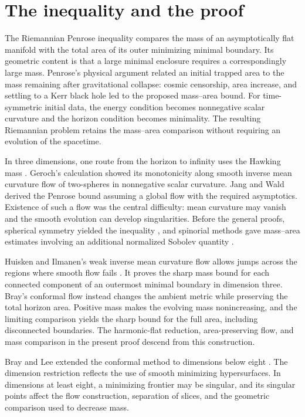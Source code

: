\section{The inequality and the proof}
\label{sec:rpi:introduction}

The Riemannian Penrose inequality compares the mass of an asymptotically
flat manifold with the total area of its outer minimizing minimal
boundary. Its geometric content is that a large minimal enclosure
requires a correspondingly large mass. Penrose's physical argument
\cite{Penrose1973} related an initial trapped area to the mass remaining
after gravitational collapse: cosmic censorship, area increase, and
settling to a Kerr black hole led to the proposed mass--area bound.
For time-symmetric initial data, the energy condition becomes
nonnegative scalar curvature and the horizon condition becomes
minimality. The resulting Riemannian problem retains the mass--area
comparison without requiring an evolution of the spacetime.

In three dimensions, one route from the horizon to infinity uses the Hawking mass
\cite{Hawking1968}. Geroch's calculation \cite{Geroch1973} showed its
monotonicity along smooth inverse mean curvature flow of two-spheres
in nonnegative scalar curvature. Jang and
Wald \cite[Section~5]{JangWald1977} derived the Penrose bound assuming
a global flow with the required asymptotics. Existence of such a flow
was the central difficulty: mean curvature may vanish and the smooth
evolution can develop singularities. Before the general proofs,
spherical symmetry yielded the inequality \cite{MalecOMurchadha1994},
and spinorial methods gave mass--area estimates involving an additional
normalized Sobolev quantity \cite{Herzlich1997}.

Huisken and Ilmanen's weak inverse mean curvature flow allows jumps
across the regions where smooth flow fails \cite{HuiskenIlmanen2001}.
It proves the sharp mass bound for each connected component of an
outermost minimal boundary in dimension three. Bray's conformal flow
\cite{Bray2001} instead changes the ambient metric while preserving the
total horizon area. Positive mass makes the evolving mass nonincreasing,
and the limiting comparison yields the sharp bound for the full area,
including disconnected boundaries. The harmonic-flat reduction,
area-preserving flow, and mass comparison in the present proof descend
from this construction.

Bray and Lee extended the conformal method to dimensions below eight
\cite{BrayLee2009}. The dimension restriction reflects the use of smooth
minimizing hypersurfaces. In
dimensions at least eight, a minimizing frontier may be singular, and
its singular points affect the flow construction, separation of slices,
and the geometric comparison used to decrease mass.

